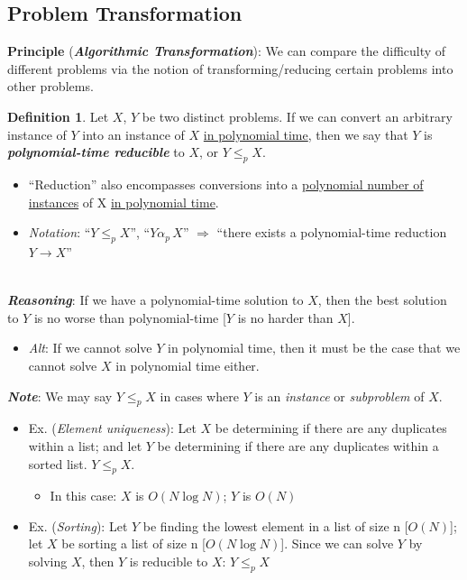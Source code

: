 \documentclass[12pt]{extarticle}
\theoremstyle{definition}
\newtheorem*{definition}{Definition}
\theoremstyle{remark}
\begin{document}
\subsection{Problem Transformation}
\textbf{Principle} (\textbf{\textit{Algorithmic Transformation}}): We can compare the difficulty of different problems via the notion of transforming/reducing certain problems into other problems.

\begin{definition}
    Let $X$, $Y$ be two distinct problems. If we can convert an arbitrary instance of $Y$ into an instance of $X$ \ul{in polynomial time}, then we say that $Y$ is \textbf{\textit{polynomial-time reducible}} to $X$, or $Y\leq_pX$.\begin{itemize}
        \item “Reduction” also encompasses conversions into a \ul{polynomial number of instances} of X \ul{in polynomial time}.
        \item \textit{Notation}: ``$Y\leq_pX$'', ``$Y\alpha_p\,X$'' $\Rightarrow$ ``there exists a polynomial-time reduction $Y\to X$''
    \end{itemize}
\end{definition}

~\\
\noindent\textbf{\textit{Reasoning}}: If we have a polynomial-time solution to $X$, then the best solution to $Y$ is no worse than polynomial-time [$Y$ is no harder than $X$].\begin{itemize}
    \item \textit{Alt}: If we cannot solve $Y$ in polynomial time, then it must be the case that we cannot solve $X$ in polynomial time either.
\end{itemize}

\noindent\textbf{\textit{Note}}: We may say $Y\leq_pX$ in cases where $Y$ is an \textit{instance} or \textit{subproblem} of $X$.
\begin{itemize}
    \item Ex. (\textit{Element uniqueness}): Let $X$ be determining if there are any duplicates within a list; and let $Y$ be determining if there are any duplicates within a sorted list.  $Y\leq_pX$.\begin{itemize}
        \item In this case: $X$ is $O(N\log N)$; $Y$ is $O(N)$
    \end{itemize}
    \item Ex. (\textit{Sorting}): Let $Y$ be finding the lowest element in a list of size n [$O(N)$]; let $X$ be sorting a list of size n [$O(N\log N)$]. Since we can solve $Y$ by solving $X$, then $Y$ is reducible to $X$: $Y\leq_pX$
\end{itemize}
\end{document}
